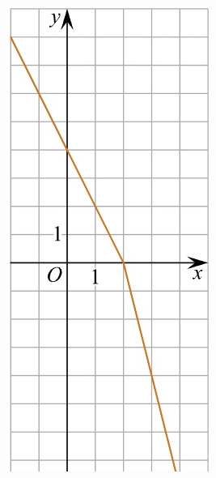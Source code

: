 \begin{class}[number=6]
\begin{listofex}
\begin{minipage}[c]{0.17\textwidth}
			\includegraphics[align=t, width=\textwidth]{pics/G111M4C6-1.jpg}

\end{minipage}
\end{listofex}
\end{class}
